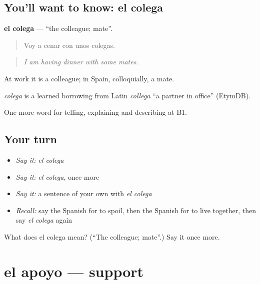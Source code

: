 \subsection*{You'll want to know: el colega}
\textbf{el colega} — \textquotedblleft{}the colleague; mate\textquotedblright{}.

\begin{quote}
Voy a cenar con unos colegas.
\end{quote}

\begin{quote}
\emph{I am having dinner with some mates.}
\end{quote}

At work it is a colleague; in Spain, colloquially, a mate.

\begin{cousinweb}
\emph{colega} is a learned borrowing from Latin \emph{collēga} \textquotedblleft{}a partner in office\textquotedblright{} (EtymDB).
\end{cousinweb}

\begin{grammarlens}[title={What you've built}]
One more word for telling, explaining and describing at B1.
\end{grammarlens}

\subsection*{Your turn}
\begin{itemize}
\raggedright
  \item \emph{Say it:} \emph{el colega}
  \item \emph{Say it:} \emph{el colega}, once more
  \item \emph{Say it:} a sentence of your own with \emph{el colega}
  \item \emph{Recall:} say the Spanish for to spoil, then the Spanish for to live together, then say \emph{el colega} again
\end{itemize}

\begin{tcolorbox}[breakable,colback=teal!4,colframe=teal!35!black,title={Before you move on}]
What does el colega mean? (\textquotedblleft{}The colleague; mate\textquotedblright{}.) Say it once more.
\end{tcolorbox}
\section[el apoyo]{el apoyo — support}

